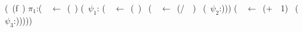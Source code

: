 \vspace*{-.2cm}
        {\small
        \renewcommand{\arraystretch}{1}{
          \begin{uprogram}
             (\DEFINE~(f~\px)
              $\pi_1$:(\LET~\py~$\leftarrow $\
 (\length~\px) \IN
              (\SIF~$\psi_1$:\py
             (\LET~\pu~$\leftarrow$~(\Sum~\px)~\IN
              (\LET~\pw~$\leftarrow$\ (/~\pu~\py)~\IN
              (\SRETURN~$\psi_2$:\pw)))
             (\LET~\pz~$\leftarrow$~(+~\py~1)~\IN
              (\SRETURN~$\psi_3$:\pz)))))   
        \end{uprogram}}
}
\vspace*{.1cm}
